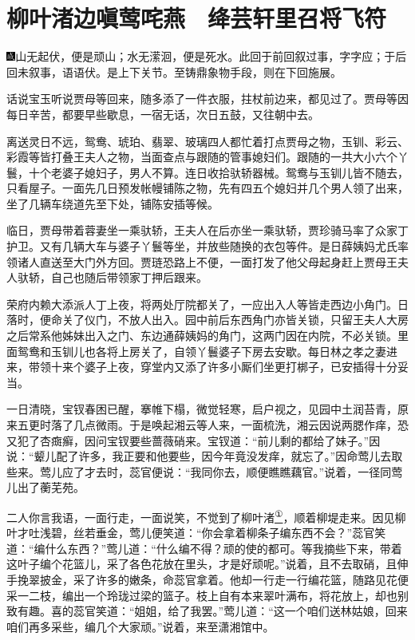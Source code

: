 

\chapter{柳叶渚边嗔莺咤燕　绛芸轩里召将飞符}

{\includegraphics[width=3mm]{../Images/00005}山无起伏，便是顽山；水无潆洄，便是死水。此回于前回叙过事，字字应；于后回未叙事，语语伏。是上下关节。至铸鼎象物手段，则在下回施展。}

话说宝玉听说贾母等回来，随多添了一件衣服，拄杖前边来，都见过了。贾母等因每日辛苦，都要早些歇息，一宿无话，次日五鼓，又往朝中去。

离送灵日不远，鸳鸯、琥珀、翡翠、玻璃四人都忙着打点贾母之物，玉钏、彩云、彩霞等皆打叠王夫人之物，当面查点与跟随的管事媳妇们。跟随的一共大小六个丫鬟，十个老婆子媳妇子，男人不算。连日收拾驮轿器械。鸳鸯与玉钏儿皆不随去，只看屋子。一面先几日预发帐幔铺陈之物，先有四五个媳妇并几个男人领了出来，坐了几辆车绕道先至下处，铺陈安插等候。

临日，贾母带着蓉妻坐一乘驮轿，王夫人在后亦坐一乘驮轿，贾珍骑马率了众家丁护卫。又有几辆大车与婆子丫鬟等坐，并放些随换的衣包等件。是日薛姨妈尤氏率领诸人直送至大门外方回。贾琏恐路上不便，一面打发了他父母起身赶上贾母王夫人驮轿，自己也随后带领家丁押后跟来。

荣府内赖大添派人丁上夜，将两处厅院都关了，一应出入人等皆走西边小角门。日落时，便命关了仪门，不放人出入。园中前后东西角门亦皆关锁，只留王夫人大房之后常系他姊妹出入之门、东边通薛姨妈的角门，这两门因在内院，不必关锁。里面鸳鸯和玉钏儿也各将上房关了，自领丫鬟婆子下房去安歇。每日林之孝之妻进来，带领十来个婆子上夜，穿堂内又添了许多小厮们坐更打梆子，已安插得十分妥当。

一日清晓，宝钗春困已醒，搴帷下榻，微觉轻寒，启户视之，见园中土润苔青，原来五更时落了几点微雨。于是唤起湘云等人来，一面梳洗，湘云因说两腮作痒，恐又犯了杏癍癣，因问宝钗要些蔷薇硝来。宝钗道：``前儿剩的都给了妹子。''因说：``颦儿配了许多，我正要和他要些，因今年竟没发痒，就忘了。''因命莺儿去取些来。莺儿应了才去时，蕊官便说：``我同你去，顺便瞧瞧藕官。''说着，一径同莺儿出了蘅芜苑。

二人你言我语，一面行走，一面说笑，不觉到了柳叶渚\href{../Text/part0063_split_000.html\#lnkback_1_a}{\textsuperscript{①}}，顺着柳堤走来。因见柳叶才吐浅碧，丝若垂金，莺儿便笑道：``你会拿着柳条子编东西不会？''蕊官笑道：``编什么东西？''莺儿道：``什么编不得？顽的使的都可。等我摘些下来，带着这叶子编个花篮儿，采了各色花放在里头，才是好顽呢。''说着，且不去取硝，且伸手挽翠披金，采了许多的嫩条，命蕊官拿着。他却一行走一行编花篮，随路见花便采一二枝，编出一个玲珑过梁的篮子。枝上自有本来翠叶满布，将花放上，却也别致有趣。喜的蕊官笑道：``姐姐，给了我罢。''莺儿道：``这一个咱们送林姑娘，回来咱们再多采些，编几个大家顽。''说着，来至潇湘馆中。

